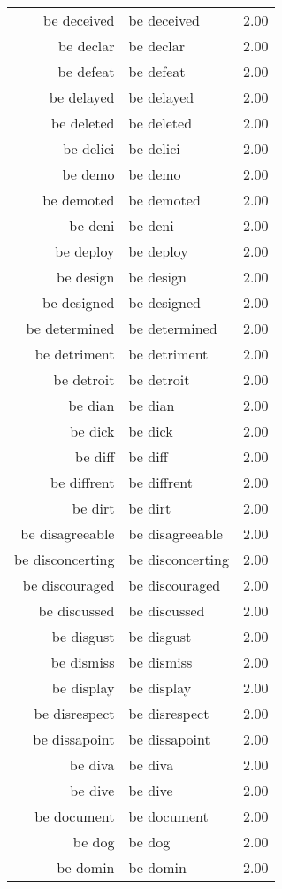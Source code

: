 \begin{table}[ht]
\begin{tabular}{rlr}
  be deceived & be deceived & 2.00 \\ 
  be declar & be declar & 2.00 \\ 
  be defeat & be defeat & 2.00 \\ 
  be delayed & be delayed & 2.00 \\ 
  be deleted & be deleted & 2.00 \\ 
  be delici & be delici & 2.00 \\ 
  be demo & be demo & 2.00 \\ 
  be demoted & be demoted & 2.00 \\ 
  be deni & be deni & 2.00 \\ 
  be deploy & be deploy & 2.00 \\ 
  be design & be design & 2.00 \\ 
  be designed & be designed & 2.00 \\ 
  be determined & be determined & 2.00 \\ 
  be detriment & be detriment & 2.00 \\ 
  be detroit & be detroit & 2.00 \\ 
  be dian & be dian & 2.00 \\ 
  be dick & be dick & 2.00 \\ 
  be diff & be diff & 2.00 \\ 
  be diffrent & be diffrent & 2.00 \\ 
  be dirt & be dirt & 2.00 \\ 
  be disagreeable & be disagreeable & 2.00 \\ 
  be disconcerting & be disconcerting & 2.00 \\ 
  be discouraged & be discouraged & 2.00 \\ 
  be discussed & be discussed & 2.00 \\ 
  be disgust & be disgust & 2.00 \\ 
  be dismiss & be dismiss & 2.00 \\ 
  be display & be display & 2.00 \\ 
  be disrespect & be disrespect & 2.00 \\ 
  be dissapoint & be dissapoint & 2.00 \\ 
  be diva & be diva & 2.00 \\ 
  be dive & be dive & 2.00 \\ 
  be document & be document & 2.00 \\ 
  be dog & be dog & 2.00 \\ 
  be domin & be domin & 2.00 \\ 

\end{tabular}
\end{table}
